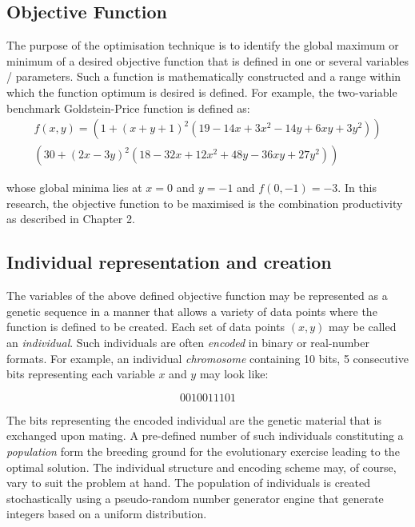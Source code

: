 \documentclass[ExampleMasters.tex]{subfiles}
\begin{document}
		\subsection{Objective Function}
			The purpose of the optimisation technique is to identify the global maximum or minimum of a desired objective function that is defined in one or several variables / parameters. Such a function is mathematically constructed and a range within which the function optimum is desired is defined. For example, the two-variable benchmark Goldstein-Price function is defined as:
			\begin{multline}
				f(x,y)=(1+(x+y+1)^2(19-14x+3x^2-14y+6xy+3y^2))\\
					(30+(2x-3y)^2(18-32x+12x^2+48y-36xy+27y^2))
			\end{multline}

			whose global minima lies at $x=0$ and $y=-1$ and $f(0,-1)=-3$. In this research, the objective function to be maximised is the combination productivity as described in Chapter 2.\\

		\subsection{Individual representation and creation}
			The variables of the above defined objective function may be represented as a genetic sequence in a manner that allows a variety of data points where the function is defined to be created. Each set of data points $(x,y)$ may be called an \textit{individual}. Such individuals are often \textit{encoded} in binary or real-number formats. For example, an individual \textit{chromosome} containing 10 bits, 5 consecutive bits representing each variable $x$ and $y$ may look like:

			$$ 0     0     1     0     0     1     1     1     0     1$$

			The bits representing the encoded individual are the genetic material that is exchanged upon mating. A pre-defined number of such individuals constituting a \textit{population} form the breeding ground for the evolutionary exercise leading to the optimal solution. The individual structure and encoding scheme may, of course, vary to suit the problem at hand. The population of individuals is created stochastically using a pseudo-random number generator engine that generate integers based on a uniform distribution.\\
\end{document}
